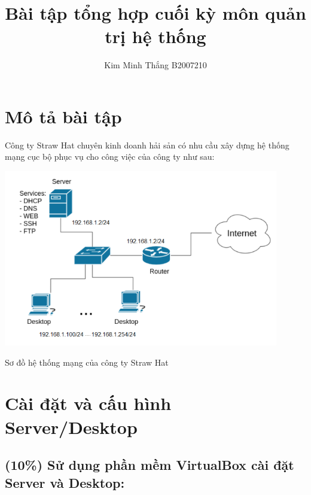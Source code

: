 \documentclass[a4paper, 11pt]{article}
\title{Bài tập tổng hợp cuối kỳ môn quản trị hệ thống}
\author{Kim Minh Thắng B2007210}
\begin{document}
\maketitle
\tableofcontents
\listoffigures
\listoftables
\lstlistoflistings

\section*{Mô tả bài tập}

Công ty Straw Hat chuyên kinh doanh hải sản có nhu cầu xây dựng hệ thống mạng cục bộ phục vụ cho công việc của công ty như sau:

\begin{minipage}{\linewidth}
    \captionsetup{type=figure}
    \includegraphics[width=12cm]{images/networks.png}
    \caption{Sơ đồ hệ thống mạng của công ty Straw Hat}
\end{minipage}

\section{Cài đặt và cấu hình Server/Desktop}

\subsection{(10\%) Sử dụng phần mềm VirtualBox cài đặt Server và Desktop:}
\end{document}
